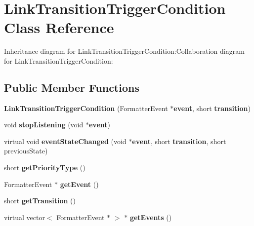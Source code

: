 \section{LinkTransitionTriggerCondition Class Reference}
\label{classbr_1_1pucrio_1_1telemidia_1_1ginga_1_1ncl_1_1model_1_1link_1_1LinkTransitionTriggerCondition}
Inheritance diagram for LinkTransitionTriggerCondition:Collaboration diagram for LinkTransitionTriggerCondition:\subsection*{Public Member Functions}
\begin{CompactItemize}
\item 
\textbf{LinkTransitionTriggerCondition} (FormatterEvent $\ast${\bf event}, short {\bf transition})\label{classbr_1_1pucrio_1_1telemidia_1_1ginga_1_1ncl_1_1model_1_1link_1_1LinkTransitionTriggerCondition_78be3d64f50889b975b357a5398da99b}

\item 
void \textbf{stopListening} (void $\ast${\bf event})\label{classbr_1_1pucrio_1_1telemidia_1_1ginga_1_1ncl_1_1model_1_1link_1_1LinkTransitionTriggerCondition_30fe02416806f60f10cfcc8e42cbefb3}

\item 
virtual void \textbf{eventStateChanged} (void $\ast${\bf event}, short {\bf transition}, short previousState)\label{classbr_1_1pucrio_1_1telemidia_1_1ginga_1_1ncl_1_1model_1_1link_1_1LinkTransitionTriggerCondition_620cd8995737df722bbbf897b13a97dc}

\item 
short \textbf{getPriorityType} ()\label{classbr_1_1pucrio_1_1telemidia_1_1ginga_1_1ncl_1_1model_1_1link_1_1LinkTransitionTriggerCondition_ae7d2f7d0ac4466813deee19bbea7ebe}

\item 
FormatterEvent $\ast$ \textbf{getEvent} ()\label{classbr_1_1pucrio_1_1telemidia_1_1ginga_1_1ncl_1_1model_1_1link_1_1LinkTransitionTriggerCondition_3efa52713f97472630a2e5507559830d}

\item 
short \textbf{getTransition} ()\label{classbr_1_1pucrio_1_1telemidia_1_1ginga_1_1ncl_1_1model_1_1link_1_1LinkTransitionTriggerCondition_9993d40530e44b62467cadc5b80fc9e5}

\item 
virtual vector$<$ FormatterEvent $\ast$ $>$ $\ast$ \textbf{getEvents} ()\label{classbr_1_1pucrio_1_1telemidia_1_1ginga_1_1ncl_1_1model_1_1link_1_1LinkTransitionTriggerCondition_77d29bf7857d5b09d0ef4fb69cfc31cd}

\end{CompactItemize}
